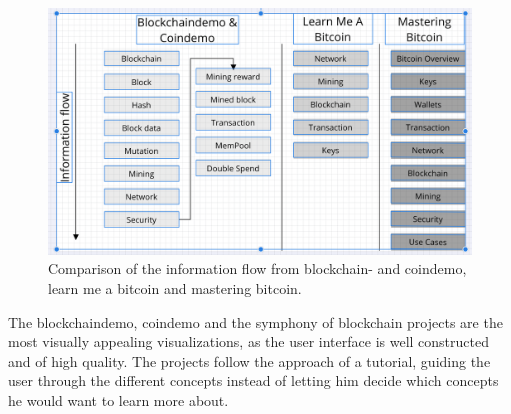 \begin{figure}
    \centering
    \includegraphics[width=\linewidth]{latex-vorlage_v1.5/graphics/ProcessBC.png}
    \caption{Comparison of the information flow from blockchain- and coindemo, learn me a bitcoin and mastering bitcoin.}
    \label{fig:ProcessBC}
\end{figure}

The blockchaindemo, coindemo and the symphony of blockchain projects are the most visually appealing visualizations, as the user interface is well constructed and of high quality. The projects follow the approach of a tutorial, guiding the user through the different concepts instead of letting him decide which concepts he would want to learn more about.
